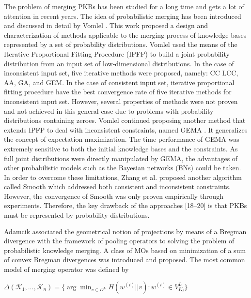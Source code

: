 \documentclass[]{iosart2c}
\begin{document}
  The problem of merging PKBs has been studied for a long time and gets a lot of attention in recent years. The idea of probabilistic merging has been introduced and discussed in detail by Vomlel \cite{18} . This work proposed a design and characterization of methods applicable to the merging process of knowledge bases represented by a set of probability distributions. Vomlel used the means of the Iterative Proportional Fitting Procedure (IPFP) to build a joint probability distribution from an input set of low-dimensional distributions. In the case of inconsistent input set, five iterative methods were proposed, namely: CC LCC, AA, GA, and GEM. In the case of consistent input set, iterative proportional fitting procedure have the best convergence rate of five iterative methods for inconsistent input set. However, several properties of methods were not proven and not achieved in this general case due to problems with probability distributions containing zeroes. Vomlel continued proposing another method that extends IPFP to deal with inconsistent constraints, named GEMA \cite{19}. It generalizes the concept of expectation maximization. The time performance of GEMA was extremely sensitive to both the initial knowledge bases and the constraints. As full joint distributions were directly manipulated by GEMA, the advantages of other probabilistic models such as the Bayesian networks (BNs) could be taken. In order to overcome these limitations, Zhang et al. \cite{20} proposed another algorithm called Smooth which addressed both consistent and inconsistent constraints. However, the convergence of Smooth was only proven empirically through experiments. Therefore, the key drawback of the approaches [18–20] is that PKBs must be represented by probability distributions.

  Adamcik \cite{23} associated the geometrical notion of projections by means of a Bregman divergence with the framework of pooling operators to solving the problem of probabilistic knowledge merging. A class of MOs based on minimization of a sum of convex Bregman divergences was introduced and proposed. The most common model of merging operator was defined by

  $\Delta (\mathcal{K}_1, ... ,\mathcal{K}_n) = \{ \arg \min_{v \in D^L} H(w^{(i)}||v) : w^{(i)} \in V^L_{K_i}\}$
\end{document}
